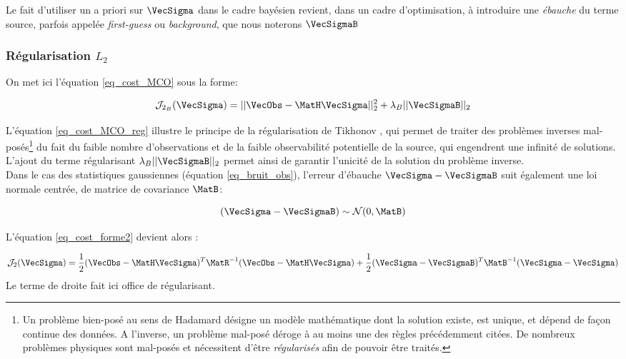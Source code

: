 Le fait d'utiliser un a priori sur $\VecSigma$ dans le cadre bayésien revient, dans un cadre d'optimisation, à introduire une \textit{ébauche} du terme source, parfois appelée \textit{first-guess} ou \textit{background}, que nous noterons $\VecSigmaB$

\subsubsection{Régularisation $L_2$}

On met ici l'équation \eqref{eq_cost_MCO} sous la forme: 
 
 \begin{equation}
 \mathcal{J}_{2_B}(\VecSigma) = ||\VecObs - \MatH \VecSigma||_2^2 + \lambda_B ||\VecSigmaB||_2
 \label{eq_cost_MCO_reg}
 \end{equation}
 
 L'équation \eqref{eq_cost_MCO_reg} illustre le principe de la régularisation de Tikhonov \cite{Tikhonov1963}, qui permet de traiter des problèmes inverses mal-posés\footnote{Un problème bien-posé au sens de Hadamard \cite{Hadamard1902} désigne un modèle mathématique dont la solution existe, est unique, et dépend de façon continue des données. A l'inverse, un problème mal-posé déroge à au moins une des règles précédemment citées. De nombreux problèmes physiques sont mal-posés et nécessitent d'être \textit{régularisés} afin de pouvoir être traités.} du fait du faible nombre d'observations et de la faible observabilité potentielle de la source, qui engendrent une infinité de solutions. L'ajout du terme régularisant $\lambda_B ||\VecSigmaB||_2$ permet ainsi de garantir l'unicité de la solution du problème inverse. \\
 
 Dans le cas des statistiques gaussiennes (équation \eqref{eq_bruit_obs}), l'erreur d'ébauche $\VecSigma - \VecSigmaB$ suit également une loi normale centrée, de matrice de covariance $\MatB$:
 
 \begin{equation}
 (\VecSigma - \VecSigmaB) \sim \mathcal{N}(0,\MatB)
 \label{eq_erreur_ebauche}
 \end{equation}
 
 L'équation \eqref{eq_cost_forme2} devient alors \cite{Winiarek2011}:

\begin{equation}
\mathcal{J}_2(\VecSigma) = \dfrac{1}{2}(\VecObs - \MatH \VecSigma)^T \MatR^{-1}(\VecObs - \MatH\VecSigma) + \dfrac{1}{2}(\VecSigma - \VecSigmaB)^T\MatB^{-1}(\VecSigma - \VecSigma)
\label{eq_cost_reg_forme2}
\end{equation}
Le terme de droite fait ici office de régularisant. \\

